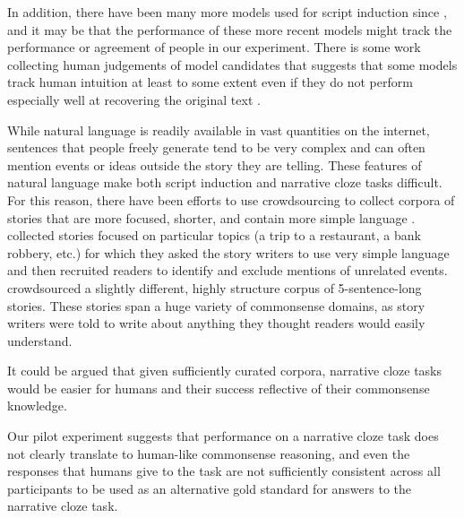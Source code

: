 \documentclass[10pt,a4paper]{article}
\begin{document}


In addition, there have been many more models used for script induction since , and it may be that the performance of these more recent models might track the performance or agreement of people in our experiment. There is some work collecting human judgements of model candidates that suggests that some models track human intuition at least to some extent even if they do not perform especially well at recovering the original text \cite{pichotta2016learning}.

While natural language is readily available in vast quantities on the internet, sentences that people freely generate tend to be very complex and can often mention events or ideas outside the story they are telling. These features of natural language make both script induction and narrative cloze tasks difficult. For this reason, there have been efforts to use crowdsourcing to collect corpora of stories that are more focused, shorter, and contain more simple language \cite{li2013story, mostafazadeh2016corpus}.  collected stories focused on particular topics (a trip to a restaurant, a bank robbery, etc.) for which they asked the story writers to use very simple language and then recruited readers to identify and exclude mentions of unrelated events.  crowdsourced a slightly different, highly structure corpus of 5-sentence-long stories. These stories span a huge variety of commonsense domains, as story writers were told to write about anything they thought readers would easily understand.

It could be argued that given sufficiently curated corpora, narrative cloze tasks would be easier for humans and their success reflective of their commonsense knowledge.

Our pilot experiment suggests that performance on a narrative cloze task does not clearly translate to human-like commonsense reasoning, and even the responses that humans give to the task are not sufficiently consistent across all participants to be used as an alternative gold standard for answers to the narrative cloze task.
\end{document}
